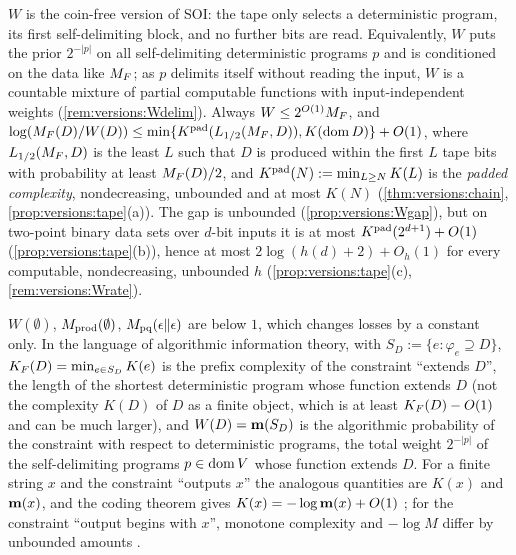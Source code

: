$W$ is the coin-free version of SOI: the tape only selects a deterministic program, its first self-delimiting block, and no further bits are read. Equivalently, $W$ puts the prior $2^{-|p|}$ on all self-delimiting deterministic programs $p$ and is conditioned on the data like $M_{F}$; as $p$ delimits itself without reading the input, $W$ is a countable mixture of partial computable functions with input-independent weights (\cref{rem:versions:Wdelim}). Always $W\le2^{O(1)}M_{F}$, and $\log(M_{F}(D)/W(D))\le\min\{K^{\mathrm{pad}}(L_{1/2}(M_{F},D)),K(\operatorname{dom} D)\}+O(1)$, where $L_{1/2}(M_{F},D)$ is the least $L$ such that $D$ is produced within the first $L$ tape bits with probability at least $M_{F}(D)/2$, and $K^{\mathrm{pad}}(N):=\min_{L\ge N}K(L)$ is the \emph{padded complexity}, nondecreasing, unbounded and at most $K(N)$ (\cref{thm:versions:chain}, \cref{prop:versions:tape}(a)). The gap is unbounded (\cref{prop:versions:Wgap}), but on two-point binary data sets over $d$-bit inputs it is at most $K^{\mathrm{pad}}(2^{d+1})+O(1)$ (\cref{prop:versions:tape}(b)), hence at most $2\log(h(d)+2)+O_h(1)$ for every computable, nondecreasing, unbounded $h$ (\cref{prop:versions:tape}(c), \cref{rem:versions:Wrate}).

$W(\emptyset)$, $M_{\mathrm{prod}}(\emptyset)$, $M_{\mathrm{pq}}(\epsilon\Vert\epsilon)$ are below $1$, which changes losses by a constant only. In the language of algorithmic information theory, with $S_D:=\{e:\varphi_e\supseteq D\}$, $K_{F}(D)=\min_{e\in S_D}K(e)$ is the prefix complexity of the constraint ``extends $D$'', the length of the shortest deterministic program whose function extends $D$ (not the complexity $K(D)$ of $D$ as a finite object, which is at least $K_{F}(D)-O(1)$ and can be much larger), and $W(D)=\mathbf{m}(S_D)$ is the algorithmic probability of the constraint with respect to deterministic programs, the total weight $2^{-|p|}$ of the self-delimiting programs $p\in\operatorname{dom} V$ whose function extends $D$. For a finite string $x$ and the constraint ``outputs $x$'' the analogous quantities are $K(x)$ and $\mathbf{m}(x)$, and the coding theorem gives $K(x)=-\log\mathbf{m}(x)+O(1)$ \citep[\S4.3]{li2008introduction}; for the constraint ``output begins with $x$'', monotone complexity and $-\log M$ differ by unbounded amounts \citep{gacs1983relation}.

